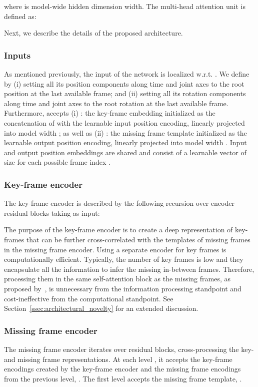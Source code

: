 \documentclass[letterpaper]{article} \usepackage[]{aaai23}  \usepackage{times}  \usepackage{helvet}  \usepackage{courier}  \usepackage[hyphens]{url}  \usepackage{graphicx} \urlstyle{rm} \def\UrlFont{\rm}  \usepackage{natbib}  \usepackage{caption} \frenchspacing  \setlength{\pdfpagewidth}{8.5in} \setlength{\pdfpageheight}{11in}
\begin{document}
where  is model-wide hidden dimension width. The multi-head attention unit is defined as:

Next, we describe the details of the proposed architecture.

\subsubsection{Inputs} 
As mentioned previously, the input of the network is localized w.r.t. . We define  by (i) setting all its position components along time and joint axes to the root position at the last available frame; and (ii) setting all its rotation components along time and joint axes to the root rotation at the last available frame. Furthermore,  accepts (i) : the key-frame embedding initialized as the concatenation of  with the learnable input position encoding, linearly projected into model width ; as well as (ii) : the missing frame template initialized as the learnable output position encoding, linearly projected into model width . Input and output position embeddings are shared and consist of a learnable vector of size  for each possible frame index . 

\subsubsection{Key-frame encoder} 
The key-frame encoder is described by the following recursion over  encoder residual blocks taking  as input:

The purpose of the key-frame encoder is to create a deep representation of key-frames that can be further cross-correlated with the templates of missing frames in the missing frame encoder. Using a separate encoder for key frames is computationally efficient. Typically, the number of key frames is low and they encapsulate all the information to infer the missing in-between frames. Therefore, processing them in the same self-attention block as the missing frames, as proposed by~\citet{duan2021singleshot}, is unnecessary from the information processing standpoint and cost-ineffective from the computational standpoint. See Section~\ref{ssec:architectural_novelty} for an extended discussion.

\subsubsection{Missing frame encoder} 
The missing frame encoder iterates over  residual blocks, cross-processing the key- and missing frame representations. At each level , it accepts the key-frame encodings  created by the key-frame encoder and the missing frame encodings from the previous level, . The first level  accepts the missing frame template, .
\end{document}
